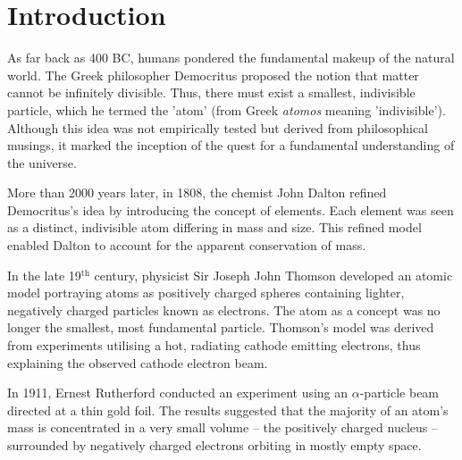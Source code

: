 \documentclass[bachelor,ngerman,english]{GAUBM}
\begin{document}
	

\frontmatter
\maketitle
\cleardoublepage
\onehalfspacing
\tableofcontents
\mainmatter

\chapter{Introduction}
\label{ch:introduction}
As far back as 400 BC, humans pondered the fundamental makeup of the natural world. The Greek philosopher Democritus proposed the notion that matter cannot be infinitely divisible. Thus, there must exist a smallest, indivisible particle, which he termed the 'atom' (from Greek \textit{atomos} meaning 'indivisible'). Although this idea was not empirically tested but derived from philosophical musings, it marked the inception of the quest for a fundamental understanding of the universe.

More than 2000 years later, in 1808, the chemist John Dalton refined Democritus's idea by introducing the concept of elements. Each element was seen as a distinct, indivisible atom differing in mass and size. This refined model enabled Dalton to account for the apparent conservation of mass.

In the late 19$^\text{th}$ century, physicist Sir Joseph John Thomson developed an atomic model portraying atoms as positively charged spheres containing lighter, negatively charged particles known as electrons. The atom as a concept was no longer the smallest, most fundamental particle. Thomson's model was derived from experiments utilising a hot, radiating cathode emitting electrons, thus explaining the observed cathode electron beam.

In 1911, Ernest Rutherford conducted an experiment using an $\alpha$-particle beam directed at a thin gold foil. The results suggested that the majority of an atom's mass is concentrated in a very small volume – the positively charged nucleus – surrounded by negatively charged electrons orbiting in mostly empty space.
\end{document}
